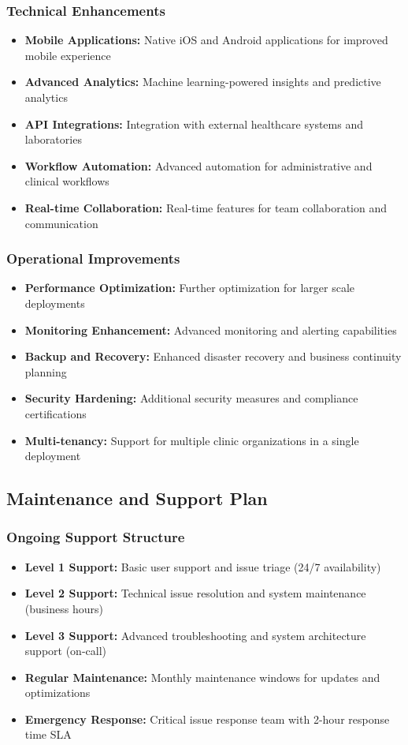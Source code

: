 \documentclass[12pt,a4paper]{article}
\begin{document}
\subsubsection{Technical Enhancements}
\begin{itemize}
    \item \textbf{Mobile Applications:} Native iOS and Android applications for improved mobile experience
    \item \textbf{Advanced Analytics:} Machine learning-powered insights and predictive analytics
    \item \textbf{API Integrations:} Integration with external healthcare systems and laboratories
    \item \textbf{Workflow Automation:} Advanced automation for administrative and clinical workflows
    \item \textbf{Real-time Collaboration:} Real-time features for team collaboration and communication
\end{itemize}

\subsubsection{Operational Improvements}
\begin{itemize}
    \item \textbf{Performance Optimization:} Further optimization for larger scale deployments
    \item \textbf{Monitoring Enhancement:} Advanced monitoring and alerting capabilities
    \item \textbf{Backup and Recovery:} Enhanced disaster recovery and business continuity planning
    \item \textbf{Security Hardening:} Additional security measures and compliance certifications
    \item \textbf{Multi-tenancy:} Support for multiple clinic organizations in a single deployment
\end{itemize}

\subsection{Maintenance and Support Plan}

\subsubsection{Ongoing Support Structure}
\begin{itemize}
    \item \textbf{Level 1 Support:} Basic user support and issue triage (24/7 availability)
    \item \textbf{Level 2 Support:} Technical issue resolution and system maintenance (business hours)
    \item \textbf{Level 3 Support:} Advanced troubleshooting and system architecture support (on-call)
    \item \textbf{Regular Maintenance:} Monthly maintenance windows for updates and optimizations
    \item \textbf{Emergency Response:} Critical issue response team with 2-hour response time SLA
\end{itemize}
\end{document}
